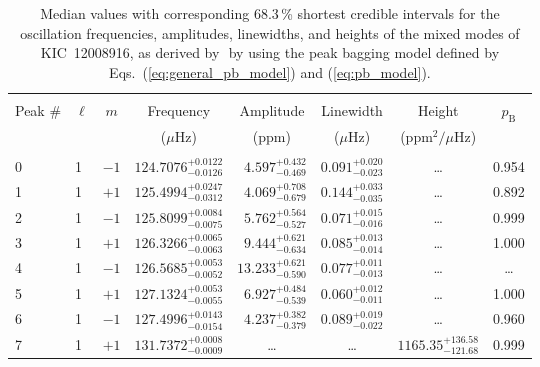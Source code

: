 \begin{table*}[!]
\caption{Median values with corresponding 68.3\,\% shortest credible intervals for the oscillation frequencies, amplitudes, linewidths, and heights of the mixed modes of KIC~12008916, as derived by \diamonds\,\,by using the peak bagging model defined by Eqs.~(\ref{eq:general_pb_model}) and (\ref{eq:pb_model}).}
\label{tab:12008916m}
\centering
\begin{tabular}{llcrrlrc}
\hline\hline
\\[-8pt]          
Peak \# & $\ell$ & $m$ & \multicolumn{1}{c}{Frequency} & \multicolumn{1}{c}{Amplitude} & \multicolumn{1}{c}{Linewidth} & \multicolumn{1}{c}{Height}& $p_\mathrm{B}$\\
 & & & \multicolumn{1}{c}{($\mu$Hz)} & \multicolumn{1}{c}{(ppm)} & \multicolumn{1}{c}{($\mu$Hz)} & \multicolumn{1}{c}{(ppm$^2/\mu$Hz)}\\
\hline \\[-8pt]
 0 & 1 & $-1$ & $    124.7076_{-      0.0126}^{+      0.0122}$ & $       4.597_{-       0.469}^{+       0.432}$ & $       0.091_{-       0.023}^{+       0.020}$ & \multicolumn{1}{c}{\dots} & 0.954\\[1pt]
1 & 1 & $+1$ & $    125.4994_{-      0.0312}^{+      0.0247}$ & $       4.069_{-       0.679}^{+       0.708}$ & $       0.144_{-       0.035}^{+       0.033}$ & \multicolumn{1}{c}{\dots} & 0.892\\[1pt]
2 & 1 & $-1$ & $    125.8099_{-      0.0075}^{+      0.0084}$ & $       5.762_{-       0.527}^{+       0.564}$ & $       0.071_{-       0.016}^{+       0.015}$ & \multicolumn{1}{c}{\dots} & 0.999\\[1pt]
3 & 1 & $+1$ & $    126.3266_{-      0.0063}^{+      0.0065}$ & $       9.444_{-       0.634}^{+       0.621}$ & $       0.085_{-       0.014}^{+       0.013}$ & \multicolumn{1}{c}{\dots} & 1.000\\[1pt]
4 & 1 & $-1$ & $    126.5685_{-      0.0052}^{+      0.0053}$ & $      13.233_{-       0.590}^{+       0.621}$ & $       0.077_{-       0.013}^{+       0.011}$ & \multicolumn{1}{c}{\dots} &\dots \\[1pt]
5 & 1 & $+1$ & $    127.1324_{-      0.0055}^{+      0.0053}$ & $       6.927_{-       0.539}^{+       0.484}$ & $       0.060_{-       0.011}^{+       0.012}$ & \multicolumn{1}{c}{\dots} & 1.000\\[1pt]
6 & 1 & $-1$ & $    127.4996_{-      0.0154}^{+      0.0143}$ & $       4.237_{-       0.379}^{+       0.382}$ & $       0.089_{-       0.022}^{+       0.019}$ & \multicolumn{1}{c}{\dots} & 0.960\\[1pt]
7 & 1 & $+1$ & $    131.7372_{-      0.0009}^{+      0.0008}$ & \multicolumn{1}{c}{\dots} & \multicolumn{1}{c}{\dots} & $     1165.35_{-      121.68}^{+      136.58}$ & 0.999\\[1pt]


\end{tabular}
\end{table*}
